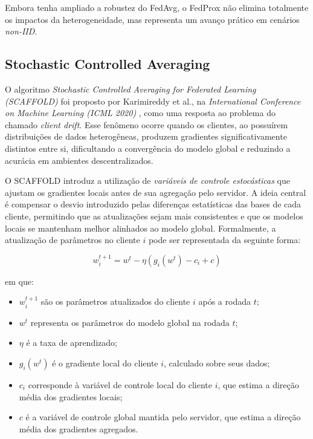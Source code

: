 \documentclass[
	12pt,				%
	openright,			%
	oneside,			%
	a4paper,			%
	english,			%
	french,				%
	spanish,			%
	brazil,				%
	]{abntex2}
\begin{document}
Embora tenha ampliado a robustez do FedAvg, o FedProx não elimina totalmente os impactos da heterogeneidade, mas representa um avanço prático em cenários \textit{non-IID}.

\subsection{Stochastic Controlled Averaging}

O algoritmo \textit{Stochastic Controlled Averaging for Federated Learning (SCAFFOLD)} foi proposto por Karimireddy et al., na \textit{International Conference on Machine Learning (ICML 2020)} \cite{karimireddy2020scaffold}, como uma resposta ao problema do chamado \textit{client drift}. Esse fenômeno ocorre quando os clientes, ao possuírem distribuições de dados heterogêneas, produzem gradientes significativamente distintos entre si, dificultando a convergência do modelo global e reduzindo a acurácia em ambientes descentralizados.  

O SCAFFOLD introduz a utilização de \textit{variáveis de controle estocásticas} que ajustam os gradientes locais antes de sua agregação pelo servidor. A ideia central é compensar o desvio introduzido pelas diferenças estatísticas das bases de cada cliente, permitindo que as atualizações sejam mais consistentes e que os modelos locais se mantenham melhor alinhados ao modelo global. Formalmente, a atualização de parâmetros no cliente $i$ pode ser representada da seguinte forma:

\begin{equation}
w_{i}^{t+1} = w^{t} - \eta \left( g_{i}(w^{t}) - c_{i} + c \right)
\label{eq:scaffold}
\end{equation}

\noindent em que:
\begin{itemize}
    \item $w_{i}^{t+1}$ são os parâmetros atualizados do cliente $i$ após a rodada $t$;
    \item $w^{t}$ representa os parâmetros do modelo global na rodada $t$;
    \item $\eta$ é a taxa de aprendizado;
    \item $g_{i}(w^{t})$ é o gradiente local do cliente $i$, calculado sobre seus dados;
    \item $c_{i}$ corresponde à variável de controle local do cliente $i$, que estima a direção média dos gradientes locais;
    \item $c$ é a variável de controle global mantida pelo servidor, que estima a direção média dos gradientes agregados.
\end{itemize}
\end{document}
